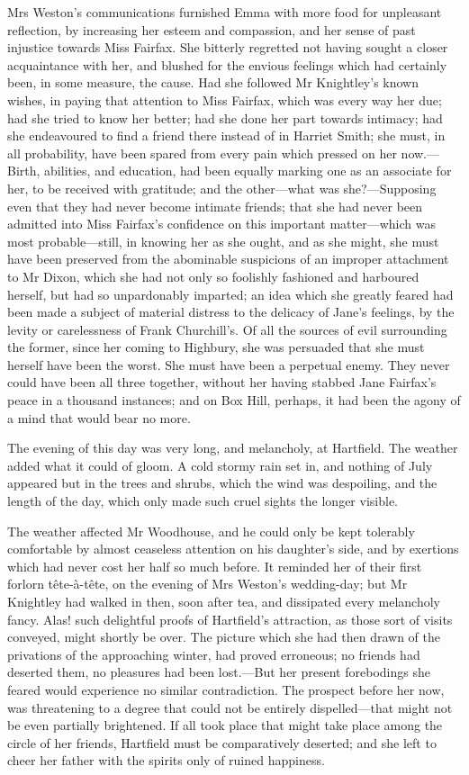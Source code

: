 Mrs Weston's communications furnished Emma with more food for unpleasant reflection, by increasing her esteem and compassion, and her sense of past injustice towards Miss Fairfax. She bitterly regretted not having sought a closer acquaintance with her, and blushed for the envious feelings which had certainly been, in some measure, the cause. Had she followed Mr Knightley's known wishes, in paying that attention to Miss Fairfax, which was every way her due; had she tried to know her better; had she done her part towards intimacy; had she endeavoured to find a friend there instead of in Harriet Smith; she must, in all probability, have been spared from every pain which pressed on her now.—Birth, abilities, and education, had been equally marking one as an associate for her, to be received with gratitude; and the other—what was she?—Supposing even that they had never become intimate friends; that she had never been admitted into Miss Fairfax's confidence on this important matter—which was most probable—still, in knowing her as she ought, and as she might, she must have been preserved from the abominable suspicions of an improper attachment to Mr Dixon, which she had not only so foolishly fashioned and harboured herself, but had so unpardonably imparted; an idea which she greatly feared had been made a subject of material distress to the delicacy of Jane's feelings, by the levity or carelessness of Frank Churchill's. Of all the sources of evil surrounding the former, since her coming to Highbury, she was persuaded that she must herself have been the worst. She must have been a perpetual enemy. They never could have been all three together, without her having stabbed Jane Fairfax's peace in a thousand instances; and on Box Hill, perhaps, it had been the agony of a mind that would bear no more.

The evening of this day was very long, and melancholy, at Hartfield. The weather added what it could of gloom. A cold stormy rain set in, and nothing of July appeared but in the trees and shrubs, which the wind was despoiling, and the length of the day, which only made such cruel sights the longer visible.

The weather affected Mr Woodhouse, and he could only be kept tolerably comfortable by almost ceaseless attention on his daughter's side, and by exertions which had never cost her half so much before. It reminded her of their first forlorn tête-à-tête, on the evening of Mrs Weston's wedding-day; but Mr Knightley had walked in then, soon after tea, and dissipated every melancholy fancy. Alas! such delightful proofs of Hartfield's attraction, as those sort of visits conveyed, might shortly be over. The picture which she had then drawn of the privations of the approaching winter, had proved erroneous; no friends had deserted them, no pleasures had been lost.—But her present forebodings she feared would experience no similar contradiction. The prospect before her now, was threatening to a degree that could not be entirely dispelled—that might not be even partially brightened. If all took place that might take place among the circle of her friends, Hartfield must be comparatively deserted; and she left to cheer her father with the spirits only of ruined happiness.

